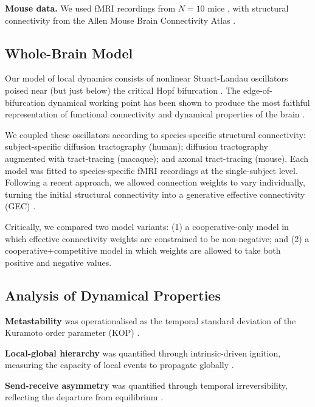 \documentclass{article}
\begin{document}
\textbf{Mouse data.} We used fMRI recordings from $N=10$ mice \citep{grandjean2016large}, with structural connectivity from the Allen Mouse Brain Connectivity Atlas \citep{oh2014mesoscale}.

\subsection{Whole-Brain Model}

Our model of local dynamics consists of nonlinear Stuart-Landau oscillators poised near (but just below) the critical Hopf bifurcation \citep{deco2017dynamics}. The edge-of-bifurcation dynamical working point has been shown to produce the most faithful representation of functional connectivity and dynamical properties of the brain \citep{deco2017dynamics, deco2020revisiting, luppi2024unravelling, cabral2017functional}.

We coupled these oscillators according to species-specific structural connectivity: subject-specific diffusion tractography (human); diffusion tractography augmented with tract-tracing (macaque); and axonal tract-tracing (mouse). Each model was fitted to species-specific fMRI recordings at the single-subject level. Following a recent approach, we allowed connection weights to vary individually, turning the initial structural connectivity into a generative effective connectivity (GEC) \citep{deco2020revisiting, gilson2020model}.

Critically, we compared two model variants: (1) a cooperative-only model in which effective connectivity weights are constrained to be non-negative; and (2) a cooperative+competitive model in which weights are allowed to take both positive and negative values.

\subsection{Analysis of Dynamical Properties}

\textbf{Metastability} was operationalised as the temporal standard deviation of the Kuramoto order parameter (KOP) \citep{deco2017dynamics, shanahan2010metastable}.

\textbf{Local-global hierarchy} was quantified through intrinsic-driven ignition, measuring the capacity of local events to propagate globally \citep{deco2019awakening, dehaene2011experimental, mashour2020conscious}.

\textbf{Send-receive asymmetry} was quantified through temporal irreversibility, reflecting the departure from equilibrium \citep{deco2020revisiting}.
\end{document}
